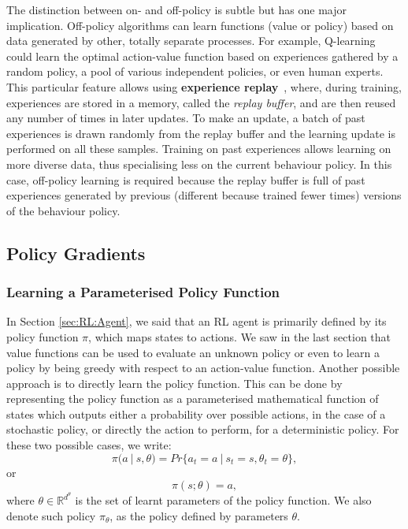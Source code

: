 The distinction between on- and off-policy is subtle but has one major implication. Off-policy algorithms can learn functions (value or policy) based on data generated by other, totally separate processes. For example, Q-learning could learn the optimal action-value function based on experiences gathered by a random policy, a pool of various independent policies, or even human experts. This particular feature allows using \textbf{experience replay}~\citep{Lin1992_ExperienceReplay}, where, during training, experiences are stored in a memory, called the \textit{replay buffer}, and are then reused any number of times in later updates. To make an update, a batch of past experiences is drawn randomly from the replay buffer and the learning update is performed on all these samples. Training on past experiences allows learning on more diverse data, thus specialising less on the current behaviour policy. In this case, off-policy learning is required because the replay buffer is full of past experiences generated by previous (different because trained fewer times) versions of the behaviour policy. 






\subsection{Policy Gradients}\label{sec:RL:Policy-based}

\subsubsection{Learning a Parameterised Policy Function}

In Section \ref{sec:RL:Agent}, we said that an RL agent is primarily defined by its policy function $\pi$, which maps states to actions. We saw in the last section that value functions can be used to evaluate an unknown policy or even to learn a policy by being greedy with respect to an action-value function. Another possible approach is to directly learn the policy function. This can be done by representing the policy function as a parameterised mathematical function of states which outputs either a probability over possible actions, in the case of a stochastic policy, or directly the action to perform, for a deterministic policy. For these two possible cases, we write:
\begin{equation}
    \pi(a\ |\ s,\theta)=Pr\{a_t=a\ |\ s_t=s,\theta_t=\theta\},
\end{equation}
or
\begin{equation}
    \pi(s;\theta)=a,
\end{equation}
where $\theta\in\mathbb{R}^{d^\theta}$ is the set of learnt parameters of the policy function. We also denote such policy $\pi_{\theta}$, as the policy defined by parameters $\theta$. 

